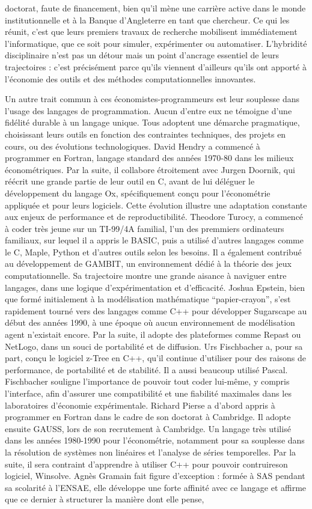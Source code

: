 doctorat, faute de financement, bien qu’il mène une carrière active dans le monde institutionnelle et à la Banque d’Angleterre en tant que chercheur. Ce qui les réunit, c’est que leurs premiers travaux de recherche mobilisent immédiatement l’informatique, que ce soit pour simuler, expérimenter ou automatiser. L’hybridité disciplinaire n’est pas un détour mais un point d’ancrage essentiel de leurs trajectoires : c’est précisément parce qu’ils viennent d’ailleurs qu’ils ont apporté à l’économie des outils et des méthodes computationnelles innovantes.


Un autre trait commun à ces économistes-programmeurs est leur souplesse dans l’usage des langages de programmation. Aucun d’entre eux ne témoigne d'une fidélité durable à un langage unique. Tous adoptent une démarche pragmatique, choisissant leurs outils en fonction des contraintes techniques, des projets en cours, ou des évolutions technologiques. David Hendry a commencé à programmer en Fortran, langage standard des années 1970-80 dans les milieux économétriques. Par la suite, il collabore étroitement avec Jurgen Doornik, qui réécrit une grande partie de leur outil en C, avant de lui déléguer le développement du langage Ox, spécifiquement conçu pour l’économétrie appliquée et pour leurs logiciels. Cette évolution illustre une adaptation constante aux enjeux de performance et de reproductibilité. Theodore Turocy, a commencé à coder très jeune sur un TI-99/4A familial, l'un des premmiers ordinateurs familiaux, sur lequel il a appris le BASIC, puis a utilisé d'autres langages comme le C, Maple, Python et d’autres outils selon les besoins. Il a également contribué au développement de GAMBIT, un environnement dédié à la théorie des jeux computationnelle. Sa trajectoire montre une grande aisance à naviguer entre langages, dans une logique d’expérimentation et d’efficacité. Joshua Epstein, bien que formé initialement à la modélisation mathématique “papier-crayon”, s’est rapidement tourné vers des langages comme C++ pour développer Sugarscape au début des années 1990, à une époque où aucun environnement de modélisation agent n’existait encore. Par la suite, il adopte des plateformes comme Repast ou NetLogo, dans un souci de portabilité et de diffusion. Urs Fischbacher a, pour sa part, conçu le logiciel z-Tree en C++, qu’il continue d’utiliser pour des raisons de performance, de portabilité et de stabilité. Il a aussi beaucoup utilisé Pascal. Fischbacher souligne l’importance de pouvoir tout coder lui-même, y compris l’interface, afin d’assurer une compatibilité et une fiabilité maximales dans les laboratoires d’économie expérimentale. Richard Pierse a d’abord appris à programmer en Fortran dans le cadre de son doctorat à Cambridge. Il adopte ensuite GAUSS, lors de son recrutement à Cambridge. Un langage très utilisé dans les années 1980-1990 pour l’économétrie, notamment pour sa souplesse dans la résolution de systèmes non linéaires et l’analyse de séries temporelles. Par la suite, il sera contraint d'apprendre à utiliser C++ pour pouvoir contruireson logiciel, Winsolve. Agnès Gramain fait figure d’exception : formée à SAS pendant sa scolarité à l’ENSAE, elle développe une forte affinité avec ce langage et affirme que ce dernier à structurer la manière dont elle pense, 